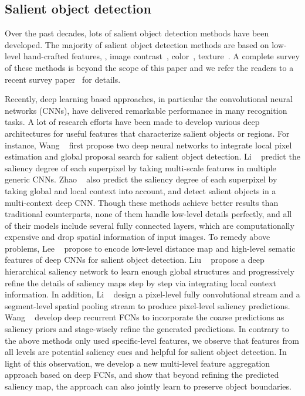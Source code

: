 \documentclass[10pt,twocolumn,letterpaper]{article}
\begin{document}
\subsection{Salient object detection}
Over the past decades, lots of salient object detection methods have been developed.
The majority of salient object detection methods are based on low-level hand-crafted features, \eg, image contrast~\cite{Federico12,jiang2013salient}, color~\cite{li2014secrets,borj2015salient}, texture~\cite{yan2013hierarchical,yang2013saliency}.
A complete survey of these methods is beyond the scope of this paper and we refer the readers to a recent survey paper~\cite{borji2015salient} for details.


Recently, deep learning based approaches, in particular the convolutional neural networks (CNNs), have delivered
remarkable performance in many recognition tasks.
A lot of research efforts have been made to develop various deep architectures for useful features that characterize salient objects or regions.
For instance, Wang \etal~\cite{wang2015deep} first propose two deep neural networks to integrate local pixel estimation and global proposal search for salient object detection.
Li \etal~\cite{li2015visual} predict the saliency degree of each superpixel by taking multi-scale features in multiple generic CNNs.
Zhao \etal~\cite{zhao2015saliency} also predict the saliency degree of each superpixel by taking global and local context into account, and detect salient objects in a multi-context deep CNN.
Though these methods achieve better results than traditional counterparts, none of them handle low-level details perfectly, and all of their models include several fully connected layers, which are computationally expensive and drop spatial information of input images.
To remedy above problems, Lee \etal~\cite{lee2016deep} propose to encode low-level distance map and high-level sematic features of deep CNNs for salient object detection.
Liu \etal~\cite{liu2016dhsnet} propose a deep hierarchical saliency network to learn enough global structures and progressively refine the details of saliency maps step by step via integrating local context
information.
In addition, Li \etal~\cite{LiYu16} design a pixel-level fully convolutional stream
and a segment-level spatial pooling stream to produce pixel-level saliency predictions.
Wang \etal~\cite{wang2016saliency} develop deep recurrent FCNs to incorporate the coarse predictions as saliency priors and stage-wisely refine the generated predictions.
In contrary to the above methods only used specific-level features, we observe that features from all levels are potential saliency cues and helpful for salient object detection.
In light of this observation, we develop a new multi-level feature aggregation approach based on deep FCNs, and show that beyond refining the predicted saliency map, the approach can also jointly learn to preserve object boundaries.
\end{document}
